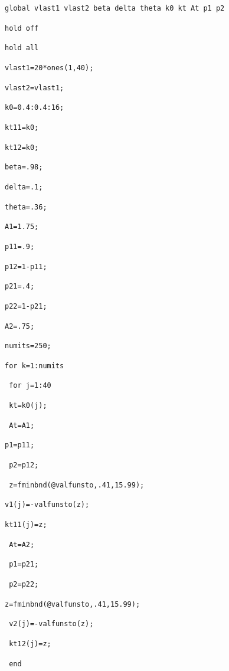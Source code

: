 \documentclass[notes=show]{beamer}
\begin{document}
\begin{frame}%


\texttt{global vlast1 vlast2 beta delta theta k0 kt At p1 p2}

\texttt{hold off}

\texttt{hold all}

\texttt{vlast1=20*ones(1,40);}

\texttt{vlast2=vlast1;}

\texttt{k0=0.4:0.4:16;}

\texttt{kt11=k0;}

\texttt{kt12=k0;}

\texttt{beta=.98;}

\texttt{delta=.1;}

\texttt{theta=.36;}

\texttt{A1=1.75;}

\texttt{p11=.9;}

\texttt{p12=1-p11;}

\texttt{p21=.4;}

\texttt{p22=1-p21;}

\texttt{A2=.75;}

\end{frame}%

\begin{frame}%

\texttt{numits=250;}

\texttt{for k=1:numits}

\texttt{\ \qquad for j=1:40}

\texttt{\ \qquad \qquad kt=k0(j);}

\texttt{\ \qquad \qquad At=A1;}

\qquad \qquad \texttt{p1=p11;}

\texttt{\ \qquad \qquad p2=p12;}

\texttt{\qquad \qquad\ z=fminbnd(@valfunsto,.41,15.99);}

\qquad \qquad \texttt{v1(j)=-valfunsto(z);}

\qquad \qquad \texttt{kt11(j)=z;}

\texttt{\ \qquad \qquad At=A2;}

\texttt{\ \qquad \qquad p1=p21;}

\texttt{\ \qquad \qquad p2=p22;}

\qquad \qquad \texttt{z=fminbnd(@valfunsto,.41,15.99);}

\texttt{\ \qquad \qquad v2(j)=-valfunsto(z);}

\texttt{\ \qquad \qquad kt12(j)=z;}

\texttt{\ \qquad end}

\end{frame}%
\end{document}

